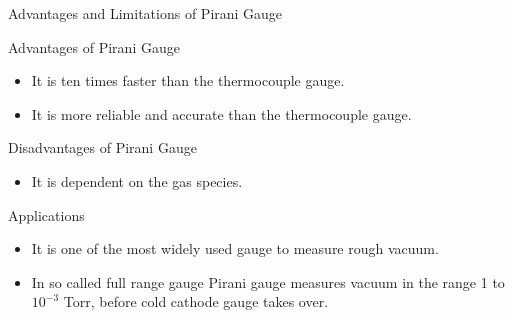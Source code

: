 \documentclass[11pt]{beamer}
\begin{document}
\begin{frame}{Advantages and Limitations of Pirani Gauge}
\begin{block}{Advantages of Pirani Gauge}
      
        \begin{itemize}
          \item    It is ten times faster than the thermocouple gauge.
          \item    It is more reliable and accurate than the thermocouple gauge.
            
        \end{itemize}
	
	\end{block}

\begin{block}{Disadvantages of Pirani Gauge}
      
        \begin{itemize}
          
          \item     It is dependent on the gas species.          
        
        \end{itemize}
	
	\end{block}


\begin{block}{Applications}
      
        \begin{itemize}
          
          \item     It is one of the most widely used gauge to measure rough vacuum.  
          \item     In so called full range gauge Pirani gauge measures vacuum in the range 1 to $10^{-3}$ Torr, before cold cathode gauge takes over.        
        
        \end{itemize}
	
	\end{block}

\end{frame}
\end{document}
